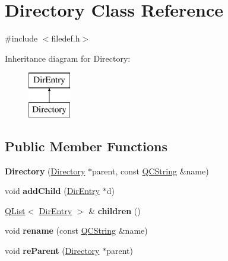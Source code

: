 \hypertarget{class_directory}{}\section{Directory Class Reference}
\label{class_directory}


{\ttfamily \#include $<$filedef.\+h$>$}

Inheritance diagram for Directory\+:\begin{figure}[H]
\begin{center}
\leavevmode
\includegraphics[height=2.000000cm]{class_directory}
\end{center}
\end{figure}
\subsection*{Public Member Functions}
\begin{DoxyCompactItemize}
\item 
\mbox{\label{class_directory_aefd2e05e867b71968887512be13cb4f8}} 
{\bfseries Directory} (\mbox{\hyperlink{class_directory}{Directory}} $\ast$parent, const \mbox{\hyperlink{class_q_c_string}{Q\+C\+String}} \&name)
\item 
\mbox{\label{class_directory_ad94561c12fe8af1ed009d78b59edff2d}} 
void {\bfseries add\+Child} (\mbox{\hyperlink{class_dir_entry}{Dir\+Entry}} $\ast$d)
\item 
\mbox{\label{class_directory_adc4ecc89e295d735cd208403e58291fd}} 
\mbox{\hyperlink{class_q_list}{Q\+List}}$<$ \mbox{\hyperlink{class_dir_entry}{Dir\+Entry}} $>$ \& {\bfseries children} ()
\item 
\mbox{\label{class_directory_a98dbd078758078e150b7110c81d94362}} 
void {\bfseries rename} (const \mbox{\hyperlink{class_q_c_string}{Q\+C\+String}} \&name)
\item 
\mbox{\label{class_directory_a39eac963ed79a2b70501fac7442e4d28}} 
void {\bfseries re\+Parent} (\mbox{\hyperlink{class_directory}{Directory}} $\ast$parent)
\end{DoxyCompactItemize}

